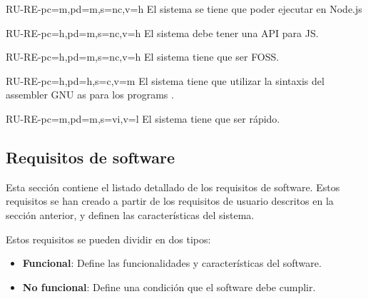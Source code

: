 \begin{userReq}{RU-RE-}{pc=m,pd=m,s=nc,v=h}
    El sistema se tiene que poder ejecutar en Node.js
\end{userReq}

\begin{userReq}{RU-RE-}{pc=h,pd=m,s=nc,v=h}
    El sistema debe tener una \gls{API} para \gls{JS}.
\end{userReq}

\begin{userReq}{RU-RE-}{pc=h,pd=m,s=nc,v=h}
    El sistema tiene que ser \gls{FOSS}.
\end{userReq}

\begin{userReq}{RU-RE-}{pc=h,pd=h,s=c,v=m}
    El sistema tiene que utilizar la sintaxis del \gls{assembler} GNU as para
    los \glspl{program} .
\end{userReq}

\begin{userReq}{RU-RE-}{pc=m,pd=m,s=vi,v=l}
    El sistema tiene que ser rápido. %
\end{userReq}

\FloatBarrier


\subsection{Requisitos de software}\label{subsec:software-requirements}

Esta sección contiene el listado detallado de los requisitos de software. Estos
requisitos se han creado a partir de los requisitos de usuario descritos en la
sección anterior, y definen las características del sistema.

\noindent
Estos requisitos se pueden dividir en dos tipos:

\begin{itemize}
    \item \textbf{Funcional}: Define las funcionalidades y características del
    software.
    \item \textbf{No funcional}: Define una condición que el software debe cumplir.
\end{itemize}


